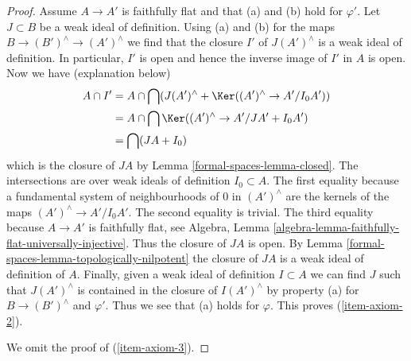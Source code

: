 \begin{proof}
\medskip\noindent
Assume $A \to A'$ is faithfully flat and that (a) and (b) hold for $\varphi'$.
Let $J \subset B$ be a weak ideal of definition. Using (a) and (b)
for the maps $B \to (B')^\wedge \to (A')^\wedge$ we find that the
closure $I'$ of $J(A')^\wedge$ is a weak ideal of definition.
In particular, $I'$ is open and hence the inverse image of $I'$
in $A$ is open. Now we have (explanation below)
\begin{align*}
A \cap I'
& =
A \cap \bigcap (J(A')^\wedge + \Ker((A')^\wedge \to A'/I_0A')) \\
& =
A \cap \bigcap \Ker((A')^\wedge \to A'/JA' + I_0 A') \\
& = \bigcap (JA + I_0)
\end{align*}
which is the closure of $JA$ by Lemma \ref{formal-spaces-lemma-closed}.
The intersections are over weak ideals of definition $I_0 \subset A$.
The first equality because a fundamental system of neighbourhoods of
$0$ in $(A')^\wedge$ are the kernels of the maps $(A')^\wedge \to A'/I_0A'$.
The second equality is trivial. The third equality because $A \to A'$
is faithfully flat, see
Algebra, Lemma \ref{algebra-lemma-faithfully-flat-universally-injective}.
Thus the closure of $JA$ is open. By Lemma \ref{formal-spaces-lemma-topologically-nilpotent}
the closure of $JA$
is a weak ideal of definition of $A$. Finally, given a weak
ideal of definition $I \subset A$ we can find $J$ such that
$J(A')^\wedge$ is contained in the closure of $I(A')^\wedge$
by property (a) for $B \to (B')^\wedge$ and $\varphi'$.
Thus we see that (a) holds for $\varphi$. This proves (\ref{item-axiom-2}).

\medskip\noindent
We omit the proof of (\ref{item-axiom-3}).
\end{proof}

